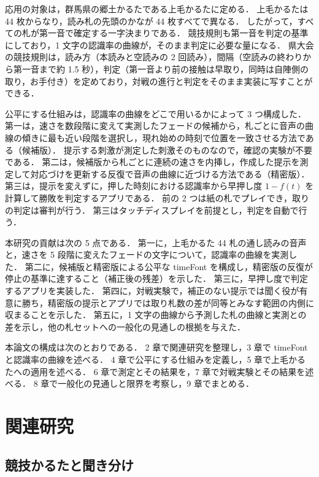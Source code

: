 応用の対象は，群馬県の郷土かるたである上毛かるたに定める．
上毛かるたは 44 枚からなり，読み札の先頭のかなが 44 枚すべてで異なる．
したがって，すべての札が第一音で確定する一字決まりである．
競技規則も第一音を判定の基準にしており，1 文字の認識率の曲線が，そのまま判定に必要な量になる．
県大会の競技規則は，読み方（本読みと空読みの 2 回読み），間隔（空読みの終わりから第一音まで約 1.5 秒），判定（第一音より前の接触は早取り，同時は自陣側の取り，お手付き）を定めており，対戦の進行と判定をそのまま実装に写すことができる．

公平にする仕組みは，認識率の曲線をどこで用いるかによって 3 つ構成した．
第一は，速さを数段階に変えて実測したフェードの候補から，札ごとに音声の曲線の傾きに最も近い段階を選択し，現れ始めの時刻で位置を一致させる方法である（候補版）．
提示する刺激が測定した刺激そのものなので，確認の実験が不要である．
第二は，候補版から札ごとに連続の速さを内挿し，作成した提示を測定して対応づけを更新する反復で音声の曲線に近づける方法である（精密版）．
第三は，提示を変えずに，押した時刻における認識率から早押し度 $1-f(t)$ を計算して勝敗を判定するアプリである．
前の 2 つは紙の札でプレイでき，取りの判定は審判が行う．
第三はタッチディスプレイを前提とし，判定を自動で行う．

本研究の貢献は次の 5 点である．
第一に，上毛かるた 44 札の通し読みの音声と，速さを 5 段階に変えたフェードの文字について，認識率の曲線を実測した．
第二に，候補版と精密版による公平な timeFont を構成し，精密版の反復が停止の基準に達すること（補正後の残差）を示した．
第三に，早押し度で判定するアプリを実装した．
第四に，対戦実験で，補正のない提示では聞く役が有意に勝ち，精密版の提示とアプリでは取り札数の差が同等とみなす範囲の内側に収まることを示した．
第五に，1 文字の曲線から予測した札の曲線と実測との差を示し，他の札セットへの一般化の見通しの根拠を与えた．

本論文の構成は次のとおりである．
2 章で関連研究を整理し，3 章で timeFont と認識率の曲線を述べる．
4 章で公平にする仕組みを定義し，5 章で上毛かるたへの適用を述べる．
6 章で測定とその結果を，7 章で対戦実験とその結果を述べる．
8 章で一般化の見通しと限界を考察し，9 章でまとめる．

\section{関連研究}

\subsection{競技かるたと聞き分け}

